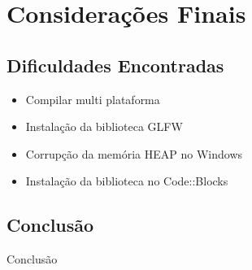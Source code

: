 \documentclass[12pt, %
openright,
oneside, %
a4paper,    %
brazil]{facom-ufu-abntex2}
\begin{document}
\chapter{Considerações Finais}

\section{Dificuldades Encontradas}

\begin{itemize}
  
  \item Compilar multi plataforma
  \item Instalação da biblioteca GLFW
  \item Corrupção da memória HEAP no Windows
  \item Instalação da biblioteca no Code::Blocks
  
\end{itemize}

\section{Conclusão}
Conclusão


\iffalse
\chapter*[Conclusão]{Conclusão}
\addcontentsline{toc}{chapter}{Conclusão}
Descrever aqui as conclusões e/ou considerações finais.
Destacar as contribuições originais do trabalho.
Propor trabalhos futuros em continuidade ao trabalho realizado.
\fi

\postextual




\end{document}
